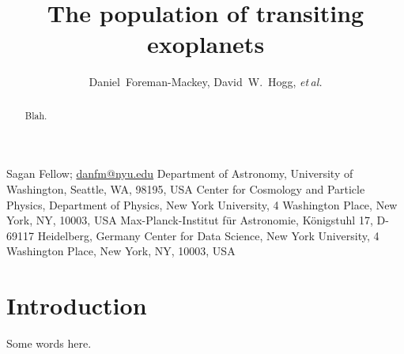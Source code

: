 \documentclass[12pt,preprint]{aastex}
\newcommand{\foreign}[1]{\emph{#1}}
\newcommand{\etal}{\foreign{et\,al.}}
\newcommand{\figlabel}[1]{\label{fig:#1}}
\newcommand{\sectlabel}[1]{\label{sect:#1}}
\begin{document}
\title{%
    The population of transiting exoplanets
}

\newcommand{\uw}{2}
\newcommand{\nyu}{3}
\newcommand{\mpia}{4}
\newcommand{\cds}{5}
\author{%
    Daniel~Foreman-Mackey\altaffilmark{1,\uw},
    David~W.~Hogg\altaffilmark{\nyu,\mpia,\cds},
    \etal
}
         {Sagan Fellow; \url{danfm@nyu.edu}}
\altaffiltext{\uw}       {Department of Astronomy, University of Washington,
                          Seattle, WA, 98195, USA}
\altaffiltext{\nyu}      {Center for Cosmology and Particle Physics,
                          Department of Physics, New York University,
                          4 Washington Place, New York, NY, 10003, USA}
\altaffiltext{\mpia}     {Max-Planck-Institut f\"ur Astronomie,
                          K\"onigstuhl 17, D-69117 Heidelberg, Germany}
\altaffiltext{\cds}      {Center for Data Science,
                          New York University,
                          4 Washington Place, New York, NY, 10003, USA}

\begin{abstract}

Blah.

\end{abstract}


\section{Introduction}
\sectlabel{intro}

Some words here.



\end{document}
